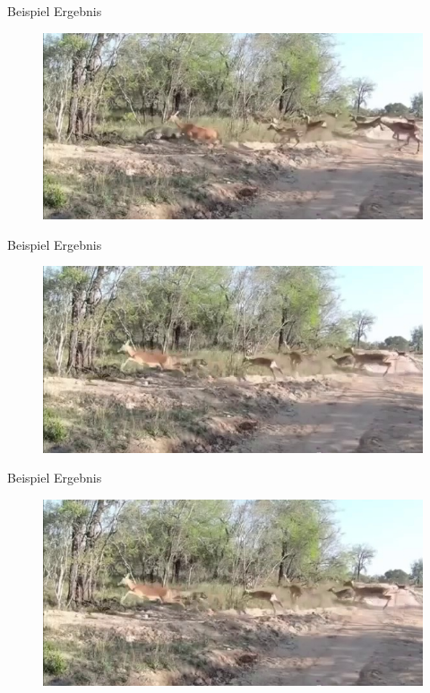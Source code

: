 \documentclass[hyperref={pdfpagelabels=false}]{beamer}
\begin{document}
\begin{frame}[t]{Beispiel Ergebnis}
	\vspace{1.3em}
	\begin{figure}
		\centering
		\includegraphics[width=0.8\linewidth]{Abbildungen/Einstieg/original_small6.jpg}
	\end{figure}
\end{frame}

\begin{frame}[t]{Beispiel Ergebnis}
	\vspace{1.3em}
	\begin{figure}
		\centering
		\includegraphics[width=0.8\linewidth]{Abbildungen/Einstieg/original_small7.jpg}
	\end{figure}
\end{frame}

\begin{frame}[t]{Beispiel Ergebnis}
	\vspace{1.3em}
	\begin{figure}
		\centering
		\includegraphics[width=0.8\linewidth]{Abbildungen/Einstieg/original_small8.jpg}
	\end{figure}
\end{frame}
\end{document}
